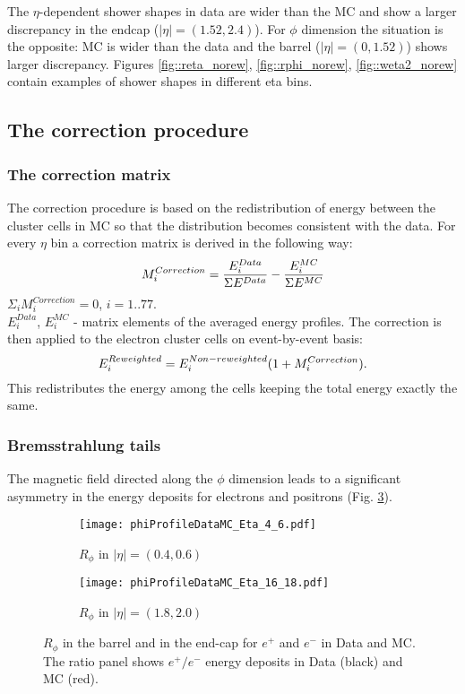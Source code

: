   The $\eta$-dependent shower shapes in data are wider than the MC and show a larger discrepancy in the endcap ($|\eta| = (1.52,2.4)$). For $\phi$ dimension the situation is the opposite: MC is wider than the data and the barrel ($|\eta| = (0,1.52)$) shows larger discrepancy. Figures \ref{fig::reta_norew}, \ref{fig::rphi_norew}, \ref{fig::weta2_norew} contain examples of shower shapes in different eta bins. 
  \subsection{The correction procedure}
  \subsubsection{The correction matrix}
  The correction procedure is based on the redistribution of energy between the cluster cells in MC so that the distribution becomes consistent with the data. For every $\eta$ bin a correction matrix is derived in the following way:
  \begin{equation}
  \nonumber
  \large {M_{i}^{Correction} = \frac{E_{i}^{Data}}{\Sigma E^{Data}} - \frac{E_{i}^{MC}}{\Sigma E^{MC}}}
  \end{equation}
  $\Sigma_i M_i^{Correction} = 0$, $i = 1..77$.\\
  $E_i^{Data}$, $E_i^{MC}$ - matrix elements of the averaged energy profiles. 
  The correction is then applied to the electron cluster cells on event-by-event basis:
  \begin{equation}
  \nonumber
  \large {E_{i}^{Reweighted} = {E_{i}^{Non-reweighted}(1+M_{i}^{Correction}).}}
  \end{equation}
  This redistributes the energy among the cells keeping the total energy exactly the same.
  \subsubsection{Bremsstrahlung tails}
  The magnetic field directed along the $\phi$ dimension leads to a significant asymmetry in the energy deposits for electrons and positrons (Fig. \ref{fig::chargeAsym}). 
  
  
      \begin{figure}[htbp]
  	\begin{subfigure}[t]{0.5\textwidth}
  		\texttt{[image: phiProfileDataMC\_Eta\_4\_6.pdf]}
  		\caption{$R_{\phi}$ in $|\eta| = (0.4,0.6)$ }
  		\label{fig::phi_profile_04}
  	\end{subfigure}
  	\hfill
  	\begin{subfigure}[t]{0.5\textwidth} 
  		\texttt{[image: phiProfileDataMC\_Eta\_16\_18.pdf]}
  		\caption{$R_{\phi}$ in $|\eta| = (1.8,2.0)$ }
  		\label{fig::phi_profile_18}
  	\end{subfigure}
  	\caption{$R_{\phi}$ in the barrel and in the end-cap for $e^+$ and $e^-$ in Data and MC. The ratio panel shows $e^+/e^-$ energy deposits in Data (black) and MC (red).}
  	\label{fig::chargeAsym}
  \end{figure}

